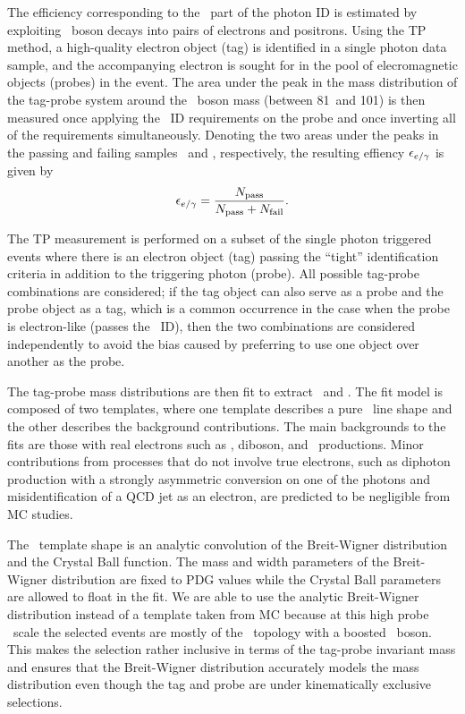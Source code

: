 The efficiency corresponding to the \egamma\ part of the photon ID is estimated by exploiting \PZ\ boson decays into pairs of electrons and positrons.
Using the TP method, a high-quality electron object (tag) is identified in a single photon data sample, and the accompanying electron is sought for in the pool of elecromagnetic objects (probes) in the event. 
The area under the peak in the mass distribution of the tag-probe system around the \PZ\ boson mass (between 81\GeV\ and 101\GeV) is then measured once applying the \Pe\Pgg\ ID requirements on the probe and once inverting all of the requirements simultaneously. 
Denoting the two areas under the peaks in the passing and failing samples \npass\ and \nfail, respectively, the resulting effiency $\epsilon_{{e}/\gamma}$ is given by
\begin{equation}
\epsilon_{{e}/\gamma} = \frac{N_{\text{pass}}}{N_{\text{pass}} + N_{\text{fail}}}.
\end{equation}

The TP measurement is performed on a subset of the single photon triggered events where there is an electron object (tag) passing the ``tight'' identification criteria in addition to the triggering photon (probe). 
All possible tag-probe combinations are considered; if the tag object can also serve as a probe and the probe object as a tag, which is a common occurrence in the case when the probe is electron-like (passes the \Pe\Pgg\ ID), then the two combinations are considered independently to avoid the bias caused by preferring to use one object over another as the probe.

The tag-probe mass distributions are then fit to extract \npass\ and \nfail. 
The fit model is composed of two templates, where one template describes a pure \Zee\ line shape and the other describes the background contributions. 
The main backgrounds to the fits are those with real electrons such as \wj, diboson, and \ttbar\ productions.
Minor contributions from processes that do not involve true electrons, such as diphoton production with a strongly asymmetric conversion on
one of the photons and misidentification of a QCD jet as an electron, are predicted to be negligible from MC studies. 
 
The \Zee\ template shape is an analytic convolution of the Breit-Wigner distribution and the Crystal Ball function. 
The mass and width parameters of the Breit-Wigner distribution are fixed to PDG values while the Crystal Ball parameters are allowed to float in the fit.
We are able to use the analytic Breit-Wigner distribution instead of a template taken from MC because at this high probe \pt\ scale the selected events are mostly of the \zj\ topology with a boosted \PZ\ boson.
This makes the selection rather inclusive in terms of the tag-probe invariant mass and ensures that the Breit-Wigner distribution accurately models the mass distribution even though the tag and probe are under kinematically exclusive selections.

